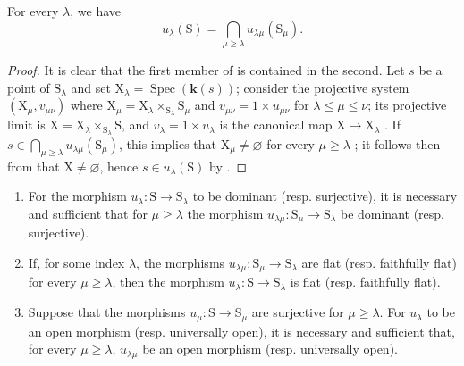 \begin{corollary}[8.3.7]
\label{IV.8.3.7}
For every $\lambda$, we have
\begin{equation}
  u_\lambda(\mathrm{S})=\bigcap_{\mu\geqslant\lambda}u_{\lambda\mu}(\mathrm{S}_\mu).
  \tag{8.3.7.1}
\label{IV.8.3.7.1}
\end{equation}
\end{corollary}

\begin{proof}
It is clear that the first member of  is contained in the second.
Let $s$ be a point of $\mathrm{S}_\lambda$ and set $\mathrm{X}_\lambda=\operatorname{Spec}(\boldsymbol{k}(s))$; consider the projective system $(\mathrm{X}_\mu,v_{\mu\nu})$ where $\mathrm{X}_\mu=\mathrm{X}_\lambda\times_{\mathrm{S}_\lambda}\mathrm{S}_\mu$ and $v_{\mu\nu}=1\times u_{\mu\nu}$ for $\lambda\leqslant\mu\leqslant\nu$; its projective limit is $\mathrm{X}=\mathrm{X}_\lambda\times_{\mathrm{S}_\lambda}\mathrm{S}$, and $v_\lambda=1\times u_\lambda$ is the canonical map $\mathrm{X}\to\mathrm{X}_\lambda$ .
If $s\in\bigcap_{\mu\geqslant\lambda}u_{\lambda\mu}(\mathrm{S}_\mu)$, this implies that $\mathrm{X}_\mu\neq\varnothing$ for every $\mu\geqslant\lambda$ ; it follows then from  that $\mathrm{X}\neq\varnothing$, hence $s\in u_\lambda(\mathrm{S})$ by .
\end{proof}

\begin{proposition}[8.3.8]
\label{IV.8.3.8}
\begin{enumerate}[label=\textup{(\roman*)}]
  \item For the morphism $u_\lambda:\mathrm{S}\to\mathrm{S}_\lambda$ to be dominant \textup{(resp.} surjective\textup{)}, it is necessary and sufficient that for $\mu\geqslant\lambda$ the morphism $u_{\lambda\mu}:\mathrm{S}_\mu\to\mathrm{S}_\lambda$ be dominant \textup{(resp.} surjective\textup{)}.
  \item If, for some index $\lambda$, the morphisms $u_{\lambda\mu}:\mathrm{S}_\mu\to\mathrm{S}_\lambda$ are flat \textup{(resp.} faithfully flat\textup{)} for every $\mu\geqslant\lambda$, then the morphism $u_\lambda:\mathrm{S}\to\mathrm{S}_\lambda$ is flat \textup{(resp.} faithfully flat\textup{)}.
  \item Suppose that the morphisms $u_\mu:\mathrm{S}\to\mathrm{S}_\mu$ are surjective for $\mu\geqslant\lambda$.
For $u_\lambda$ to be an open morphism \textup{(resp.} universally open\textup{)}, it is necessary and sufficient that, for every $\mu\geqslant\lambda$, $u_{\lambda\mu}$ be an open morphism \textup{(resp.} universally open\textup{)}.
\end{enumerate}
\end{proposition}

